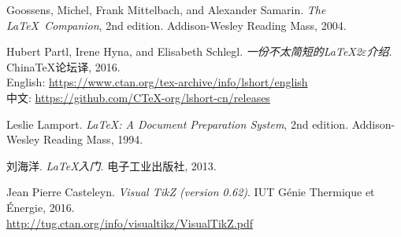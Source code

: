 \begin{thebibliography}{9}

 Goossens, Michel, Frank Mittelbach, and Alexander Samarin.
  \newblock \emph{The \LaTeX\ Companion}, 2nd edition.
  \newblock Addison-Wesley Reading Mass, 2004.

 Hubert Partl, Irene Hyna, and Elisabeth Schlegl.
  \newblock \emph{一份不太简短的\LaTeX 2$\varepsilon$介绍}.
  \newblock China\TeX 论坛译, 2016. \\
  English: \url{https://www.ctan.org/tex-archive/info/lshort/english}\\
  中文: \url{https://github.com/CTeX-org/lshort-cn/releases}
    
 Leslie Lamport.
  \newblock \emph{\LaTeX: A Document Preparation System}, 2nd edition.
  \newblock Addison-Wesley Reading Mass, 1994.
  
 刘海洋.
  \newblock \emph{\LaTeX 入门}.
  \newblock 电子工业出版社, 2013.

 Jean Pierre Casteleyn.
  \newblock \emph{Visual TikZ (version 0.62)}.
  \newblock IUT Génie Thermique et Énergie, 2016. \\
  \url{http://tug.ctan.org/info/visualtikz/VisualTikZ.pdf}

\end{thebibliography}